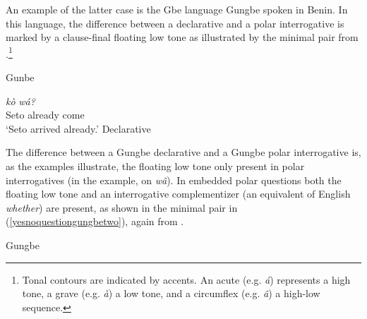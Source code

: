 An example of the latter case is the Gbe language Gungbe\label{gungbepolar} spoken in Benin. In this language, the difference between a declarative and a polar interrogative is marked by a clause-final floating low tone as illustrated by the minimal pair from \citet[93]{aboh2010sa}.\footnote{Tonal contours are indicated by accents. An acute (e.g. \textit{á}) represents a high tone, a grave (e.g. \textit{à}) a low tone, and a circumflex (e.g. \textit{\^{a}}) a high-low sequence.}

\begin{exe}
\ex Gunbe\label{yesnoquestiongungbe}
\begin{xlist}
\ex {} {\textit{kò}} {\textit{wá?}} \\
{Seto} {already} {come}\\
\trans `Seto arrived already.' \label{yesnoquestiongungbea} \hfill Declarative
\end{xlist}
\end{exe}

\noindent The difference between a Gungbe declarative and a Gungbe polar interrogative is, as the examples illustrate, the floating low tone only present in polar interrogatives (in the example, on \textit{w\^{a}}). In embedded polar questions both the floating low tone and an interrogative complementizer (an equivalent of English \textit{whether}) are present, as shown in the minimal pair in (\ref{yesnoquestiongungbetwo}), again from \citet[93]{aboh2010sa}.

\begin{exe}
\ex Gungbe\label{yesnoquestiongungbetwo}\begin{xlist}
\end{xlist}
\end{exe}

